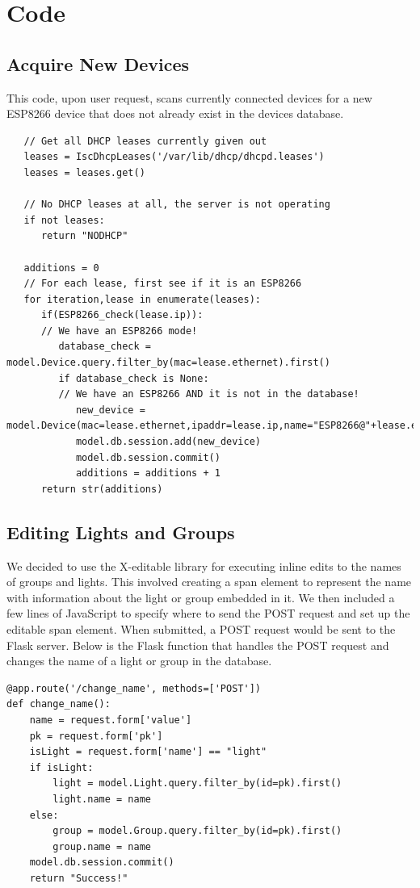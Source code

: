 \documentclass[oneside,openright]{book}
\begin{document}
\section{Code}

\subsection{Acquire New Devices}

This code, upon user request, scans currently connected devices for a new
ESP8266 device that does not already exist in the devices database.

\begin{lstlisting}
   // Get all DHCP leases currently given out
   leases = IscDhcpLeases('/var/lib/dhcp/dhcpd.leases')
   leases = leases.get()

   // No DHCP leases at all, the server is not operating
   if not leases:
      return "NODHCP"

   additions = 0
   // For each lease, first see if it is an ESP8266
   for iteration,lease in enumerate(leases):
      if(ESP8266_check(lease.ip)):
      // We have an ESP8266 mode!
         database_check = model.Device.query.filter_by(mac=lease.ethernet).first()
         if database_check is None:
         // We have an ESP8266 AND it is not in the database!
            new_device = model.Device(mac=lease.ethernet,ipaddr=lease.ip,name="ESP8266@"+lease.ethernet)
            model.db.session.add(new_device)
            model.db.session.commit()
            additions = additions + 1
      return str(additions)
   \end{lstlisting}

\subsection{Editing Lights and Groups}

We decided to use the X-editable library for executing inline edits to the
names of groups and lights. This involved creating a span element to represent
the name with information about the light or group embedded in it. We then
included a few lines of JavaScript to specify where to send the POST request
and set up the editable span element. When submitted, a POST request would be
sent to the Flask server. Below is the Flask function that handles the POST
request and changes the name of a light or group in the database.

\begin{lstlisting}
@app.route('/change_name', methods=['POST'])
def change_name():
    name = request.form['value']
    pk = request.form['pk']
    isLight = request.form['name'] == "light"
    if isLight:
        light = model.Light.query.filter_by(id=pk).first()
        light.name = name
    else:
        group = model.Group.query.filter_by(id=pk).first()
        group.name = name
    model.db.session.commit()
    return "Success!"
\end{lstlisting}
\end{document}
